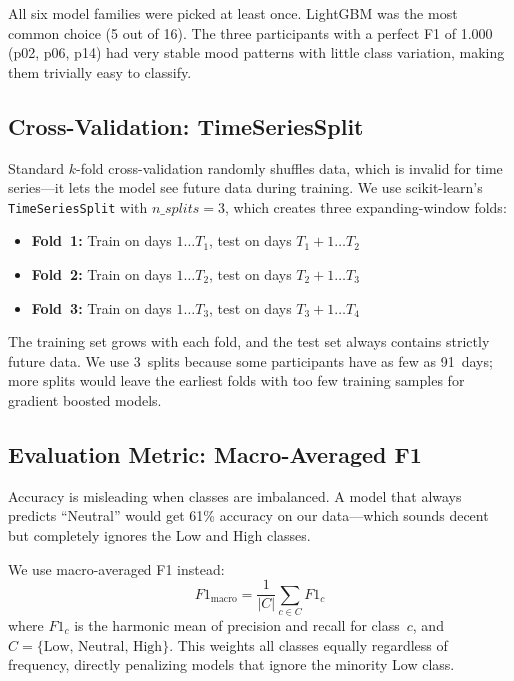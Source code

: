 \documentclass[conference]{IEEEtran}
\begin{document}
All six model families were picked at least once. LightGBM was the most common choice (5 out of 16). The three participants with a perfect F1 of 1.000 (p02, p06, p14) had very stable mood patterns with little class variation, making them trivially easy to classify.

\subsection{Cross-Validation: TimeSeriesSplit}

Standard $k$-fold cross-validation randomly shuffles data, which is invalid for time series---it lets the model see future data during training. We use scikit-learn's \texttt{TimeSeriesSplit} with $n\_splits = 3$, which creates three expanding-window folds:
\begin{itemize}
    \item \textbf{Fold~1:} Train on days $1 \ldots T_1$, test on days $T_1{+}1 \ldots T_2$
    \item \textbf{Fold~2:} Train on days $1 \ldots T_2$, test on days $T_2{+}1 \ldots T_3$
    \item \textbf{Fold~3:} Train on days $1 \ldots T_3$, test on days $T_3{+}1 \ldots T_4$
\end{itemize}

The training set grows with each fold, and the test set always contains strictly future data. We use 3~splits because some participants have as few as 91~days; more splits would leave the earliest folds with too few training samples for gradient boosted models.

\subsection{Evaluation Metric: Macro-Averaged F1}

Accuracy is misleading when classes are imbalanced. A model that always predicts ``Neutral'' would get 61\% accuracy on our data---which sounds decent but completely ignores the Low and High classes.

We use macro-averaged F1 instead:
\begin{equation}
F1_{\text{macro}} = \frac{1}{|C|} \sum_{c \in C} F1_c
\label{eq:macro_f1}
\end{equation}
where $F1_c$ is the harmonic mean of precision and recall for class~$c$, and $C = \{\text{Low, Neutral, High}\}$. This weights all classes equally regardless of frequency, directly penalizing models that ignore the minority Low class.
\end{document}

